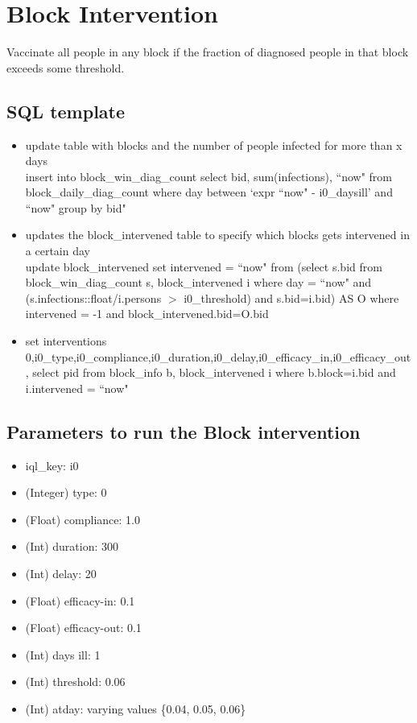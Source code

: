 \documentclass[11pt]{article}
\begin{document}
\section{Block Intervention} 
Vaccinate all people in any block if the fraction of diagnosed people in that block exceeds some threshold.

\subsection{SQL template}
\begin{itemize}

\item update table with blocks and the number of people infected for more than x days\\
insert into block\_win\_diag\_count select bid, sum(infections), ``now" from block\_daily\_diag\_count  where day between `expr ``now"  - i0\_daysill' and ``now"  group by bid"

\item updates the block\_intervened table to specify which blocks gets intervened in a certain day\\
 update block\_intervened set intervened = ``now" from (select s.bid from block\_win\_diag\_count s, block\_intervened i where day = ``now" and (s.infections::float/i.persons $>$ i0\_threshold) and s.bid=i.bid) AS O where intervened = -1 and block\_intervened.bid=O.bid

\item set interventions\\
0,i0\_type,i0\_compliance,i0\_duration,i0\_delay,i0\_efficacy\_in,i0\_efficacy\_out, select pid from block\_info b, block\_intervened i where b.block=i.bid and i.intervened = ``now"
        
\end{itemize}
\subsection{Parameters to run the Block intervention}
\begin{itemize}
\item iql\_key: i0
\item (Integer) type: 0
\item (Float) compliance: 1.0
\item (Int) duration: 300
\item (Int) delay: 20
\item (Float) efficacy-in: 0.1
\item  (Float) efficacy-out: 0.1
\item (Int) days ill: 1
\item (Int) threshold: 0.06
\item (Int) atday: varying values \{0.04, 0.05, 0.06\}
\end{itemize}
\end{document}
